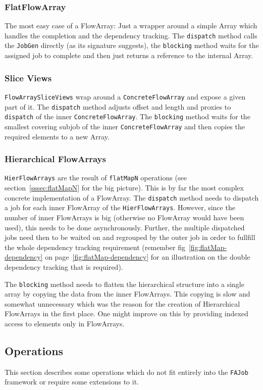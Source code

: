 \documentclass[runningheads,a4paper,fleqn]{llncs}
\begin{document}
\subsubsection{FlatFlowArray}
The most easy case of a FlowArray: Just a wrapper around a simple
Array which handles the completion and the dependency tracking. The
\texttt{dispatch} method calls the \texttt{JobGen} directly (as its
signature suggests), the \texttt{blocking} method waits for the
assigned job to complete and then just returns a reference to the
internal Array.

\subsubsection{Slice Views}
\texttt{FlowArraySliceViews} wrap around a \texttt{ConcreteFlowArray}
and expose a given part of it. The \texttt{dispatch} method adjusts 
offset and length and proxies to \texttt{dispatch} of the inner
\texttt{ConcreteFlowArray}. The \texttt{blocking} method waits for the
smallest covering subjob of the inner \texttt{ConcreteFlowArray} and
then copies the required elements to a new Array.

\subsubsection{Hierarchical FlowArrays}
\texttt{HierFlowArrays} are the result of \texttt{flatMapN} operations
(see section~\ref{sssec:flatMapN} for the big picture). This is by far
the most complex concrete implementation of a FlowArray. The
\texttt{dispatch} method needs to dispatch a job for each inner
FlowArray of the \texttt{HierFlowArrays}. However, since the number of
inner FlowArrays is big (otherwise no FlowArray would have been used),
this needs to be done asynchronously. Further, the multiple dispatched
jobs need then to be waited on and regrouped by the outer job in order
to fullfill the whole dependency tracking requirement (remember
fig~\ref{fig:flatMap-dependency} on
page~\ref{fig:flatMap-dependency} for an illustration on the
double dependency tracking that is required).

The \texttt{blocking} method needs to flatten the hierarchical
structure into a single array by copying the data from the inner
FlowArrays. This copying is slow and somewhat unnecessary which 
was the reason for the creation of Hierarchical FlowArrays in the
first place. One might improve on this by providing indexed access to
elements only in FlowArrays.

\subsection{Operations}
\label{ssec:imp-operations}
This section describes some operations which do not fit entirely into
the \texttt{FAJob} framework or require some extensions to it.
\end{document}
